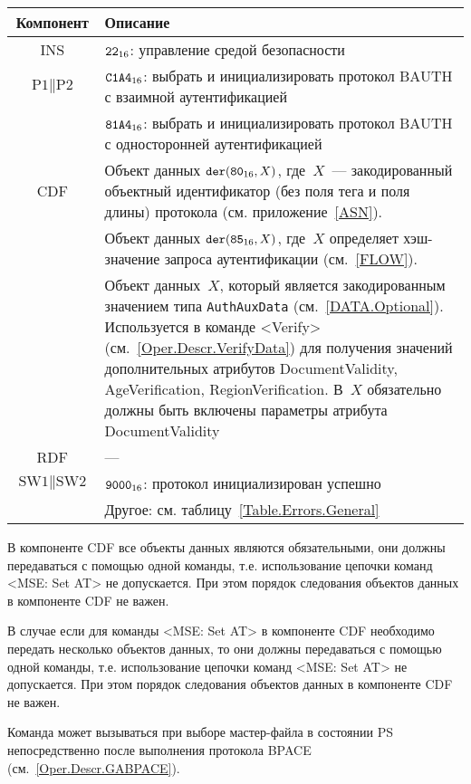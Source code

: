 \begin{table}[hbt]
\caption{}\label{Table.Oper.SetBAUTHCmd}
\begin{tabular}{|c|p{14cm}|}
\hline
Компонент & Описание \\
\hline
\hline
INS & $\texttt{22}_{16}$: управление средой безопасности\\ 
\hline
$\text{P1} \parallel\text{P2}$ & $\texttt{C1A4}_{16}$: выбрать и 
инициализировать протокол BAUTH с взаимной 
аутентификацией \\ 
\cline{2-2}
 & $\texttt{81A4}_{16}$: выбрать и инициализировать протокол BAUTH с 
односторонней аутентификацией\\
\hline
CDF & Объект данных 
$\texttt{der}(\texttt{80}_{16}, X)$, где~$X$~--- 
закодированный объектный идентификатор (без поля тега и поля 
длины) протокола (см. приложение~\ref{ASN}).\\
 & Объект данных $\texttt{der}(\texttt{85}_{16}, X)$, 
где~$X$ определяет хэш-значение запроса аутентификации (см.~\ref{FLOW}).\\
 & Объект данных~$X$, который является 
закодированным значением типа \verb|AuthAuxData| (см.~\ref{DATA.Optional}). 
Используется в команде <Verify> (см.~\ref{Oper.Descr.VerifyData}) 
для получения значений дополнительных атрибутов DocumentValidity, 
AgeVerification, RegionVerification. В~$X$ 
обязательно должны быть включены параметры атрибута DocumentValidity\\
\hline 
RDF &  --- \\
\hline
$\text{SW1} \parallel \text{SW2}$ 
  & $\texttt{9000}_{16}$: протокол инициализирован успешно \\
\cline{2-2}
  & Другое: см. таблицу~\ref{Table.Errors.General}\\
\hline
\end{tabular}
\end{table}

В компоненте CDF все объекты данных являются обязательными, 
они должны передаваться с помощью одной команды, 
т.е. использование цепочки команд <MSE: Set AT> не допускается. 
При этом порядок следования объектов данных в компоненте CDF не важен. 

В случае если для команды <MSE: Set AT> в компоненте CDF необходимо 
передать несколько объектов данных, то они должны передаваться с помощью 
одной команды, т.е. использование цепочки команд <MSE: Set AT> не 
допускается. При этом порядок следования объектов данных в компоненте CDF 
не важен. 
\fi

Команда может вызываться при выборе мастер-файла в состоянии PS 
непосредственно после выполнения протокола BPACE 
(см.~\ref{Oper.Descr.GABPACE}). 

